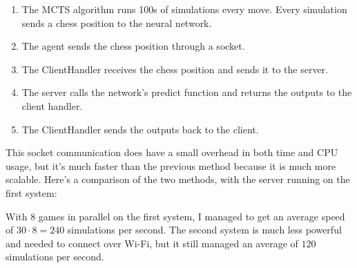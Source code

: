 \documentclass{article}
\begin{document}
\begin{enumerate}
    \item The MCTS algorithm runs 100s of simulations every move. Every simulation sends a chess position to the neural network.
    \item The agent sends the chess position through a socket.
    \item The ClientHandler receives the chess position and sends it to the server.
    \item The server calls the network's predict function and returns the outputs to the client handler.
    \item The ClientHandler sends the outputs back to the client.
\end{enumerate}

This socket communication does have a small overhead in both time and CPU usage, but it's much faster than the previous method
because it is much more scalable. Here's a comparison of the two methods, with the server running on the first system:

\begin{table}[H]
\caption{Comparison of multiprocessing and non-multiprocessing self-play}
\end{table}

With 8 games in parallel on the first system, I managed to get an average speed of $30 \cdot 8 = 240$ simulations per second.
The second system is much less powerful and needed to connect over Wi-Fi, but it still managed an average of $120$ simulations per second. 
\end{document}
